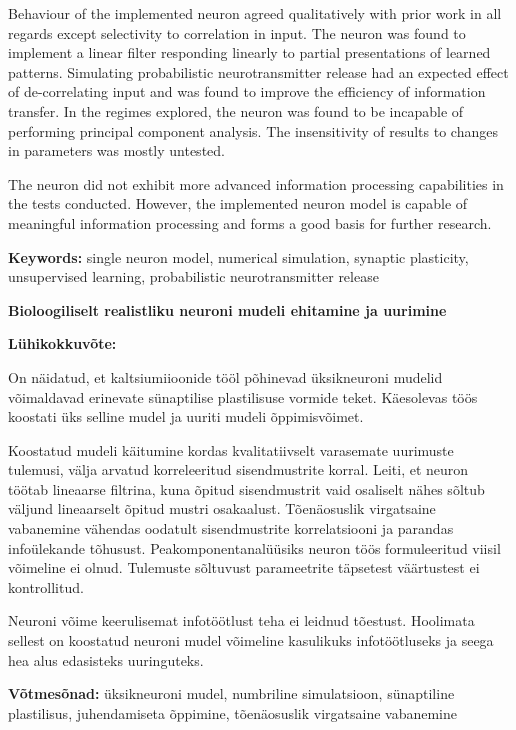 \documentclass[a4paper,12pt]{report}
\theoremstyle{definition}
\newcommand{\thesistitleEST}{Bioloogiliselt realistliku neuroni mudeli ehitamine ja uurimine}
\begin{document}
Behaviour of the implemented neuron agreed qualitatively with prior work in all regards except selectivity to correlation in input. The neuron was found to implement a linear filter responding linearly to partial presentations of learned patterns. Simulating probabilistic neurotransmitter release had an expected effect of de-correlating input and was found to improve the efficiency of information transfer. In the regimes explored, the neuron was found to be incapable of performing principal component analysis. The insensitivity of results to changes in parameters was mostly untested.

The neuron did not exhibit more advanced information processing capabilities in the tests conducted. However, the implemented neuron model is capable of meaningful information processing and forms a good basis for further research. 

\textbf{Keywords:} single neuron model, numerical simulation, synaptic plasticity, unsupervised learning, probabilistic neurotransmitter release

\vspace{0.5cm}


{\textbf
{\Large \thesistitleEST}}

\textbf{Lühikokkuvõte:}

On näidatud, et kaltsiumiioonide tööl põhinevad üksikneuroni mudelid võimaldavad erinevate sünaptilise plastilisuse vormide teket. Käesolevas töös koostati üks selline mudel ja uuriti mudeli õppimisvõimet.

Koostatud mudeli käitumine kordas kvalitatiivselt varasemate uurimuste tulemusi, välja arvatud korreleeritud sisendmustrite korral. Leiti, et neuron töötab lineaarse filtrina, kuna õpitud sisendmustrit vaid osaliselt nähes sõltub väljund lineaarselt õpitud mustri osakaalust. Tõenäosuslik virgatsaine vabanemine vähendas oodatult sisendmustrite korrelatsiooni ja parandas infoülekande tõhusust. Peakomponentanalüüsiks neuron töös formuleeritud viisil võimeline ei olnud. Tulemuste sõltuvust parameetrite täpsetest väärtustest ei kontrollitud.

Neuroni võime keerulisemat infotöötlust teha ei leidnud tõestust. Hoolimata sellest on koostatud neuroni mudel võimeline kasulikuks infotöötluseks ja seega hea alus edasisteks uuringuteks.

\textbf{Võtmesõnad:} üksikneuroni mudel, numbriline simulatsioon, sünaptiline plastilisus, juhendamiseta õppimine, tõenäosuslik virgatsaine vabanemine
\end{document}
